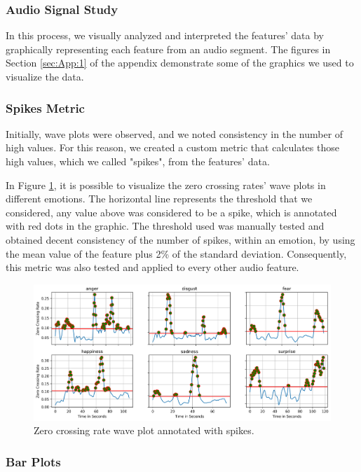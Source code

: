 \subsubsection{Audio Signal Study}

In this process, we visually analyzed and interpreted the features' data by graphically representing each feature from an audio segment. The figures in Section \ref{sec:App:1} of the appendix demonstrate some of the graphics we used to visualize the data.

\subsubsection{Spikes Metric}

Initially, wave plots were observed, and we noted consistency in the number of high values. For this reason, we created a custom metric that calculates those high values, which we called "spikes", from the features' data.

In Figure \ref{fig:zcrSpikes}, it is possible to visualize the zero crossing rates' wave plots in different emotions. The horizontal line represents the threshold that we considered, any value above was considered to be a spike, which is annotated with red dots in the graphic. The threshold used was manually tested and obtained decent consistency of the number of spikes, within an emotion, by using the mean value of the feature plus 2\% of the standard deviation. Consequently, this metric was also tested and applied to every other audio feature.

\begin{figure}[H]
	\centering
	\includegraphics[width=\textwidth]{figs/4_1_traditional/zcr_waveplot_spikes.png}
	\caption{Zero crossing rate wave plot annotated with spikes.}
	\label{fig:zcrSpikes}
\end{figure}


\subsubsection{Bar Plots}

